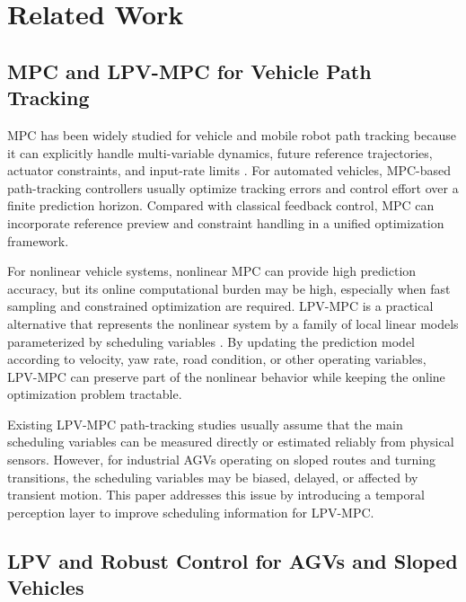 \documentclass{ieeeaccess}
\newcommand{\citep}[1]{\cite{#1}}
\begin{document}
\section{Related Work}

\label{sec:related_work}



\subsection{MPC and LPV-MPC for Vehicle Path Tracking}



MPC has been widely studied for vehicle and mobile robot path tracking because it can explicitly handle multi-variable dynamics, future reference trajectories, actuator constraints, and input-rate limits \citep{}. For automated vehicles, MPC-based path-tracking controllers usually optimize tracking errors and control effort over a finite prediction horizon. Compared with classical feedback control, MPC can incorporate reference preview and constraint handling in a unified optimization framework.



For nonlinear vehicle systems, nonlinear MPC can provide high prediction accuracy, but its online computational burden may be high, especially when fast sampling and constrained optimization are required. LPV-MPC is a practical alternative that represents the nonlinear system by a family of local linear models parameterized by scheduling variables \citep{}. By updating the prediction model according to velocity, yaw rate, road condition, or other operating variables, LPV-MPC can preserve part of the nonlinear behavior while keeping the online optimization problem tractable.



Existing LPV-MPC path-tracking studies usually assume that the main scheduling variables can be measured directly or estimated reliably from physical sensors. However, for industrial AGVs operating on sloped routes and turning transitions, the scheduling variables may be biased, delayed, or affected by transient motion. This paper addresses this issue by introducing a temporal perception layer to improve scheduling information for LPV-MPC.



\subsection{LPV and Robust Control for AGVs and Sloped Vehicles}
\end{document}

